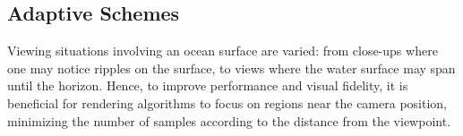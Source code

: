 
\subsection{Adaptive Schemes}
Viewing situations involving an ocean surface are varied: from close-ups where
one may notice ripples on the surface, to views where the water surface may
span until the horizon. Hence, to improve performance and visual fidelity,
it is beneficial for rendering algorithms to focus on regions near the camera
position, minimizing the number of samples according to the distance from the
viewpoint.
%
